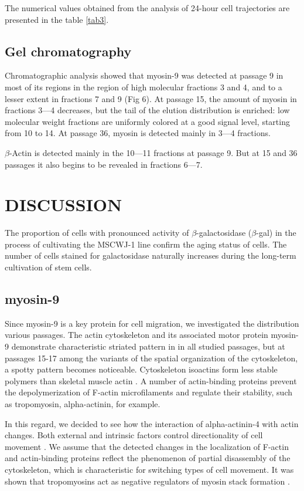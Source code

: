 \documentclass[alpha-refs]{wiley-article}
\begin{document}
The numerical values obtained from the analysis of 24-hour cell trajectories are presented in the table \ref{tab3}.

\subsection{Gel chromatography}


Chromatographic analysis showed that myosin-9 was detected at passage 9 in most of its regions in the region of high molecular fractions 3 and 4, and to a lesser extent in fractions 7 and 9 (Fig 6).
At passage 15, the amount of myosin in fractions 3–--4 decreases, but the tail of the elution distribution is enriched: low molecular weight fractions are uniformly colored at a good signal level, starting from 10 to 14.
At passage 36, myosin is detected mainly in 3---4 fractions.


$\beta$-Actin is detected mainly in the 10---11 fractions at passage 9.
But at 15 and 36 passages it also begins to be revealed in fractions 6---7.

\section{DISCUSSION}

The proportion of cells with pronounced activity of $\beta$-galactosidase ($\beta$-gal) in the process of cultivating the MSCWJ-1 line confirm the aging status of cells.
The number of cells stained for galactosidase naturally increases during the long-term cultivation of stem cells.

\subsection*{myosin-9}

Since myosin-9 is a key protein for cell migration, we investigated the distribution various passages.
The actin cytoskeleton and its associated motor protein myosin-9 demonstrate characteristic striated pattern in in all studied passages, but at passages 15-17 among the variants of the spatial organization of the cytoskeleton, a spotty pattern becomes noticeable.
Cytoskeleton isoactins form less stable polymers than skeletal muscle actin \cite{khaitlina2001functional}.
A number of actin-binding proteins prevent the depolymerization of F-actin microfilaments and regulate their stability, such as tropomyosin, alpha-actinin, for example.

In this regard, we decided to see how the interaction of alpha-actinin-4 with actin changes.
Both external and intrinsic factors control directionality of cell movement \cite{tiurin2013molecular}.
We assume that the detected changes in the localization of F-actin and actin-binding proteins reflect the phenomenon of partial disassembly of the cytoskeleton, which is characteristic for switching types of cell movement.
It was shown that tropomyosins act as negative regulators of myosin stack formation \cite{hu2019reciprocal}.
\end{document}
